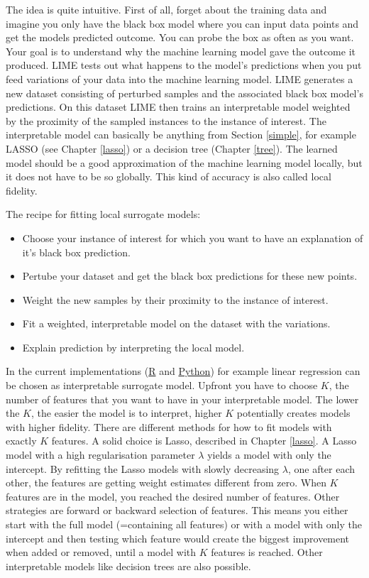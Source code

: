 \documentclass[12pt,]{krantz}
\providecommand{\tightlist}{%
  \setlength{\itemsep}{0pt}\setlength{\parskip}{0pt}}
\theoremstyle{definition}
\theoremstyle{definition}
\theoremstyle{definition}
\theoremstyle{remark}
\begin{document}
The idea is quite intuitive. First of all, forget about the training
data and imagine you only have the black box model where you can input
data points and get the models predicted outcome. You can probe the box
as often as you want. Your goal is to understand why the machine
learning model gave the outcome it produced. LIME tests out what happens
to the model's predictions when you put feed variations of your data
into the machine learning model. LIME generates a new dataset consisting
of perturbed samples and the associated black box model's predictions.
On this dataset LIME then trains an interpretable model weighted by the
proximity of the sampled instances to the instance of interest. The
interpretable model can basically be anything from Section \ref{simple},
for example LASSO (see Chapter \ref{lasso}) or a decision tree (Chapter
\ref{tree}). The learned model should be a good approximation of the
machine learning model locally, but it does not have to be so globally.
This kind of accuracy is also called local fidelity.

The recipe for fitting local surrogate models:

\begin{itemize}
\tightlist
\item
  Choose your instance of interest for which you want to have an
  explanation of it's black box prediction.
\item
  Pertube your dataset and get the black box predictions for these new
  points.
\item
  Weight the new samples by their proximity to the instance of interest.
\item
  Fit a weighted, interpretable model on the dataset with the
  variations.
\item
  Explain prediction by interpreting the local model.
\end{itemize}

In the current implementations
(\href{https://github.com/thomasp85/lime}{R} and
\href{https://github.com/marcotcr/lime}{Python}) for example linear
regression can be chosen as interpretable surrogate model. Upfront you
have to choose \(K\), the number of features that you want to have in
your interpretable model. The lower the \(K\), the easier the model is
to interpret, higher \(K\) potentially creates models with higher
fidelity. There are different methods for how to fit models with exactly
\(K\) features. A solid choice is Lasso, described in Chapter
\ref{lasso}. A Lasso model with a high regularisation parameter
\(\lambda\) yields a model with only the intercept. By refitting the
Lasso models with slowly decreasing \(\lambda\), one after each other,
the features are getting weight estimates different from zero. When
\(K\) features are in the model, you reached the desired number of
features. Other strategies are forward or backward selection of
features. This means you either start with the full model (=containing
all features) or with a model with only the intercept and then testing
which feature would create the biggest improvement when added or
removed, until a model with \(K\) features is reached. Other
interpretable models like decision trees are also possible.
\end{document}
